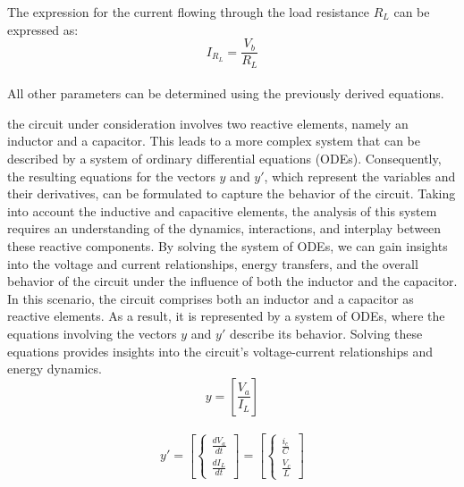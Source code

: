 The expression for the current flowing through the load resistance $R_L$ can be expressed as:\\

\begin{equation}
    I_{R_L}=\frac{V_b}{R_L}
\end{equation}\\

All other parameters can be determined using the previously derived equations.

 the circuit under consideration involves two reactive elements, namely an inductor and a capacitor. This leads to a more complex system that can be described by a system of ordinary differential equations (ODEs). Consequently, the resulting equations for the vectors $y$ and $y'$, which represent the variables and their derivatives, can be formulated to capture the behavior of the circuit. Taking into account the inductive and capacitive elements, the analysis of this system requires an understanding of the dynamics, interactions, and interplay between these reactive components. By solving the system of ODEs, we can gain insights into the voltage and current relationships, energy transfers, and the overall behavior of the circuit under the influence of both the inductor and the capacitor.\\

In this scenario, the circuit comprises both an inductor and a capacitor as reactive elements. As a result, it is represented by a system of ODEs, where the equations involving the vectors $y$ and $y'$ describe its behavior. Solving these equations provides insights into the circuit's voltage-current relationships and energy dynamics.\\

\begin{equation}
    y=[\frac{V_a}{I_L}]
\end{equation}\\

\begin{equation}
    y'=[\begin{cases}
        \frac{dV_a}{dt}\\
        \frac{dI_L}{dt}
    \end{cases}]=[\begin{cases}
        \frac{i_c}{C}\\
        \frac{V_c}{L}
    \end{cases}]
\end{equation}\\

